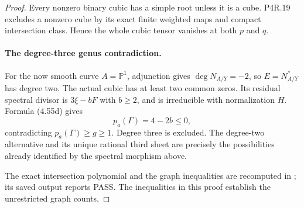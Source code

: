 \begin{proof}
Every nonzero binary cubic has a simple root unless it is
a cube. P4R.19 excludes a nonzero cube by its exact finite
weighted maps and compact intersection class. Hence the
whole cubic tensor vanishes at both $p$ and $q$.

\paragraph{The degree-three genus contradiction.}
For the now smooth curve $A=\mathbb P^1$, adjunction gives
$\deg N_{A/Y}=-2$, so $E=N_{A/Y}^*$ has degree two.
The actual cubic has at least two common zeros. Its residual
spectral divisor is $3\xi-bF$ with $b\ge2$, and is
irreducible with normalization $H$. Formula (4.55d) gives
\[
                    p_a(\Gamma)=4-2b\le0,
\]
contradicting $p_a(\Gamma)\ge g\ge1$. Degree three is
excluded. The degree-two alternative and its unique rational
third sheet are precisely the possibilities already identified
by the spectral morphism above.

The exact intersection polynomial and the graph inequalities
are recomputed in
; its saved output
reports PASS. The inequalities in this proof establish the
unrestricted graph counts.
\end{proof}
